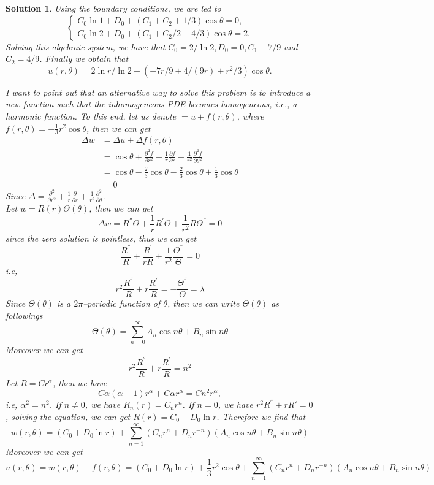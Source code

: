 \documentclass[6pt]{article}
\newtheorem{solution}{Solution}
\numberwithin{equation}{section}
\begin{document}
\begin{enumerate}
\begin{solution}
Using the boundary conditions, we are led to
\begin{equation*}
\left\{
\begin{array}{ll}
C_0\ln 1+D_0+(C_1+C_2+1/3)\cos \theta=0,\\
C_0\ln 2+D_0+(C_1+C_2/2+4/3)\cos \theta=2.
\end{array}
\right.
\end{equation*}
Solving this algebraic system, we have that $C_0=2/\ln2,D_0=0,C_1-7/9$ and $C_2=4/9$.  Finally we obtain that
\[u(r,\theta)=2\ln r/\ln 2+(-7r/9+4/(9r)+r^2/3)\cos \theta.\]

I want to point out that an alternative way to solve this problem is to introduce a new function such that the inhomogeneous PDE becomes homogeneous, i.e., a harmonic function.  To this end, let us denote $=u+f(r,\theta)$, where $f(r,\theta)=-\frac{1}{3}r^2\cos\theta$, then we can get
\begin{align*}
\Delta w&=\Delta u+\Delta f(r,\theta)\\
&=\cos\theta+\frac{\partial^2 f}{\partial r^2}+\frac{1}{r}\frac{\partial f}{\partial r}+\frac{1}{r^2}\frac{\partial^2 f}{\partial \theta^2}\\
&=\cos\theta-\frac{2}{3}\cos\theta-\frac{2}{3}\cos\theta+\frac{1}{3}\cos\theta\\
&=0
\end{align*}
Since $\Delta=\frac{\partial^2}{\partial r^2}+\frac{1}{r}\frac{\partial}{\partial r}+\frac{1}{r^2}\frac{\partial^2}{\partial \theta}$.\\
Let $w=R(r)\Theta(\theta)$, then we can get
\[\Delta w=R^{''}\Theta+\frac{1}{r}R^{'}\Theta+\frac{1}{r^2}R\Theta^{''}=0\]
since the zero solution is pointless, thus we can get
\[\frac{R^{''}}{R}+\frac{R^{'}}{rR}+\frac{1}{r^2}\frac{\Theta^{''}}{\Theta}=0\]
i.e,
\[r^2\frac{R^{''}}{R}+r\frac{R^{'}}{R}=-\frac{\Theta^{''}}{\Theta}=\lambda\]
Since $\Theta(\theta)$ is a $2\pi$--periodic function of $\theta$, then we can write $\Theta(\theta)$ as followings
\[\Theta(\theta)=\sum_{n=0}^{\infty}A_n\cos n\theta+B_n\sin n\theta\]
Moreover we can get
\[r^2\frac{R^{''}}{R}+r\frac{R^{'}}{R}=n^2\]
Let $R=Cr^\alpha$, then we have
\[C\alpha(\alpha-1)r^\alpha+C\alpha r^\alpha=Cn^2r^\alpha,\]
i.e, $\alpha^2=n^2$.   If $n\neq0$, we have $R_n(r)=C_n r^n$.  If $n=0$, we have $r^2 R^{''}+r R{'}=0$, solving the equation, we can get $R(r)=C_0+D_0\ln r$.  Therefore we find that
\[w(r,\theta)=(C_0+D_0\ln r)+\sum_{n=1}^{\infty}(C_n r^n+D_n r^{-n})(A_n\cos n\theta+B_n\sin n\theta)\]
Moreover we can get
\[u(r,\theta)=w(r,\theta)-f(r,\theta)=(C_0+D_0\ln r)+\frac{1}{3}r^2\cos\theta+\sum_{n=1}^{\infty}(C_n r^n+D_n r^{-n})(A_n\cos n\theta+B_n\sin n\theta)\]

\end{solution}
\end{enumerate}
\end{document}
